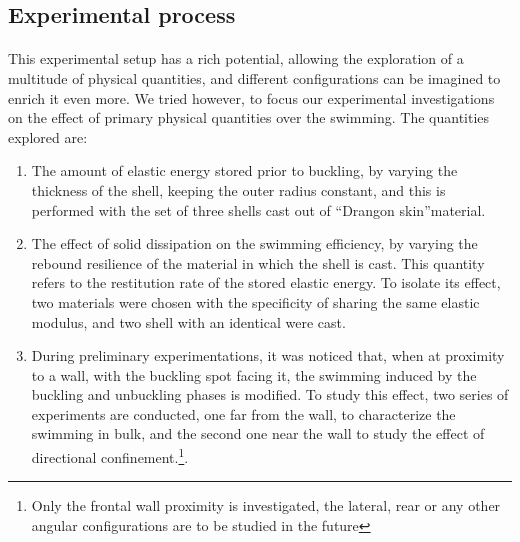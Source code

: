 \subsection{Experimental process}
\paragraph{}
This experimental setup has a rich potential, allowing the exploration of a multitude of physical quantities, and different configurations can be imagined to enrich it even more. We tried however, to focus our experimental investigations on the effect of primary physical quantities over the swimming. The quantities explored are:
\begin{enumerate}
	\item The amount of elastic energy stored prior to buckling, by varying the thickness of the shell, keeping the outer radius constant, and this is performed with the set of three shells cast out of "`Drangon skin"'\textregistered material.
	\item The effect of solid dissipation on the swimming efficiency, by varying the rebound resilience of the material in which the shell is cast. This quantity refers to the restitution rate of the stored elastic energy. To isolate its effect, two materials were chosen with the specificity of sharing the same elastic modulus, and two shell with an identical were cast.
	\item During preliminary experimentations, it was noticed that, when at proximity to a wall, with the buckling spot facing it, the swimming induced by the buckling and unbuckling phases is modified. To study this effect, two series of experiments are conducted, one far from the wall, to characterize the swimming in bulk, and the second one near the wall to study the effect of directional confinement.\footnote{Only the frontal wall proximity is investigated, the lateral, rear or any other angular configurations are to be studied in the future}. 
\end{enumerate}
